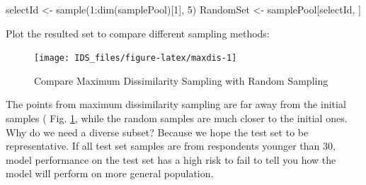 \documentclass[
  12pt,
]{krantz}
\makeatletter
\newenvironment{Shaded}{\begin{snugshade}}{\end{snugshade}}
\newcommand{\AttributeTok}[1]{\textcolor[rgb]{0.61,0.61,0.61}{#1}}
\newcommand{\ConstantTok}[1]{\textcolor[rgb]{0,0,0}{#1}}
\newcommand{\DecValTok}[1]{\textcolor[rgb]{0.06,0.06,0.06}{#1}}
\newcommand{\FunctionTok}[1]{\textcolor[rgb]{0,0,0}{#1}}
\newcommand{\NormalTok}[1]{#1}
\newcommand{\OtherTok}[1]{\textcolor[rgb]{0.37,0.37,0.37}{#1}}
\newcommand{\SpecialCharTok}[1]{\textcolor[rgb]{0,0,0}{#1}}
\newcommand{\StringTok}[1]{\textcolor[rgb]{0.5,0.5,0.5}{#1}}
\newenvironment{kframe}{%
\medskip{}
\setlength{\fboxsep}{.8em}
 \def\at@end@of@kframe{}%
 \ifinner\ifhmode%
  \def\at@end@of@kframe{\end{minipage}}%
  \begin{minipage}{\columnwidth}%
 \fi\fi%
 \def\FrameCommand##1{\hskip\@totalleftmargin \hskip-\fboxsep
 \colorbox{shadecolor}{##1}\hskip-\fboxsep
     \hskip-\linewidth \hskip-\@totalleftmargin \hskip\columnwidth}%
 \MakeFramed {\advance\hsize-\width
   \@totalleftmargin\z@ \linewidth\hsize
   \@setminipage}}%
 {\par\unskip\endMakeFramed%
 \at@end@of@kframe}
\renewenvironment{Shaded}{\begin{kframe}}{\end{kframe}}
\makeatother
\begin{document}
\begin{Shaded}
\begin{Highlighting}[]
\NormalTok{selectId }\OtherTok{\textless{}{-}} \FunctionTok{sample}\NormalTok{(}\DecValTok{1}\SpecialCharTok{:}\FunctionTok{dim}\NormalTok{(samplePool)[}\DecValTok{1}\NormalTok{], }\DecValTok{5}\NormalTok{)}
\NormalTok{RandomSet }\OtherTok{\textless{}{-}}\NormalTok{ samplePool[selectId, ]}
\end{Highlighting}
\end{Shaded}

Plot the resulted set to compare different sampling methods:

\begin{Shaded}
\end{Shaded}

\begin{figure}

{\centering \texttt{[image: IDS\_files/figure-latex/maxdis-1]} 

}

\caption{Compare Maximum Dissimilarity Sampling with  Random Sampling}\label{fig:maxdis}
\end{figure}

The points from maximum dissimilarity sampling are far away from the initial samples ( Fig. \ref{fig:maxdis}, while the random samples are much closer to the initial ones. Why do we need a diverse subset? Because we hope the test set to be representative. If all test set samples are from respondents younger than 30, model performance on the test set has a high risk to fail to tell you how the model will perform on more general population.
\end{document}
